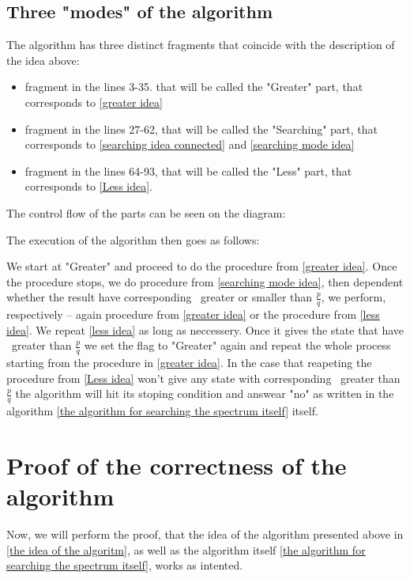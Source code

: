 \subsection{Three "modes" of the algorithm}
The algorithm has three distinct fragments that coincide with 
the description of the idea above: 
\begin{itemize}
\item fragment in the lines 3-35. that will be called the "Greater" part, 
that corresponds to \ref{greater idea}
\item fragment in the lines 27-62, that will be called the "Searching" part, 
that corresponds to \ref{searching idea connected} and \ref{searching mode idea}
\item fragment in the lines 64-93, that will be called the "Less" part, that 
corresponds to \ref{Less idea}.
\end{itemize}

The control flow of the parts can be seen on the diagram:

The execution of the algorithm then goes as follows:

We start at "Greater" and proceed to do the procedure from \ref{greater idea}. 
Once the procedure stops, we do procedure from \ref{searching mode idea}, then 
dependent whether the result have corresponding \Eoc\ greater or smaller than $\frac{p}{q}$, 
we perform, respectively -- again procedure from \ref{greater idea} or the 
procedure from \ref{less idea}. We repeat \ref{less idea} as long as neccessery. 
Once it gives the state that have \Eoc\ greater than $\frac{p}{q}$ we set the flag to 
"Greater" again and repeat the whole process starting from the procedure in \ref{greater idea}. 
In the case that reapeting the procedure from \ref{Less idea} won't give any state with 
corresponding \Eoc\ greater than $\frac{p}{q}$ the algorithm will hit its stoping condition 
and answear "no" as written in the algorithm 
\ref{the algorithm for searching the spectrum itself} itself.   

\section{Proof of the correctness of the algorithm}\label{memory state proof}
Now, we will perform the proof, that the idea of the algorithm presented above in 
\ref{the idea of the algoritm}, as 
well as the algorithm itself \ref{the algorithm for searching the spectrum itself}, 
works as intented.


